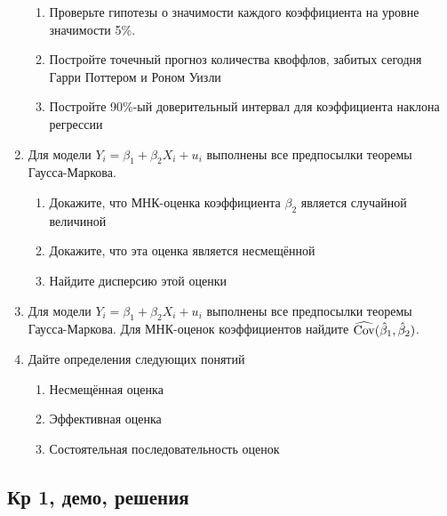 \documentclass[12pt, a4paper]{article}\usepackage[]{graphicx}\usepackage[]{color}
\begin{document}
\begin{enumerate}
\begin{enumerate}
\item Проверьте гипотезы о значимости каждого коэффициента на уровне значимости 5\%.
\item Постройте точечный прогноз количества квоффлов, забитых сегодня Гарри Поттером и Роном Уизли
\item Постройте 90\%-ый доверительный интервал для коэффициента наклона регрессии
\end{enumerate}



\item Для модели $Y_i = \beta_1 + \beta_2 X_i + u_i$ выполнены все предпосылки теоремы Гаусса-Маркова.
\begin{enumerate}
\item Докажите, что МНК-оценка коэффициента $\beta_2$ является случайной величиной
\item Докажите, что эта оценка является несмещённой
\item Найдите дисперсию этой оценки
\end{enumerate}



\item Для модели $Y_i = \beta_1 + \beta_2 X_i + u_i$ выполнены все предпосылки теоремы Гаусса-Маркова. Для МНК-оценок коэффициентов найдите $\widehat{\operatorname{Cov}}(\hat{\beta}_1, \hat{\beta}_2)$.


\item Дайте определения следующих понятий
\begin{enumerate}
\item Несмещённая оценка
\item Эффективная оценка
\item Состоятельная последовательность оценок
\end{enumerate}



\end{enumerate}

\subsection{Кр 1, демо, решения}
\end{document}
